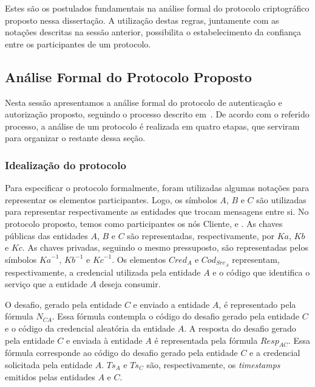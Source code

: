 Estes são os postulados fundamentais na análise formal do protocolo criptográfico proposto nessa dissertação.
A utilização destas regras, juntamente com as notações descritas na sessão anterior, possibilita o estabelecimento da confiança entre os participantes de um protocolo.

\subsection{Análise Formal do Protocolo Proposto}

Nesta sessão apresentamos a análise formal do protocolo de autenticação e autorização proposto, seguindo o processo
descrito em~\cite{Burrows1990}. De acordo com o referido processo, a análise de um protocolo é realizada em quatro etapas, que serviram para organizar o restante dessa seção.

\subsubsection{Idealização do protocolo}

\newcommand{\HT}[3]{\{\,{#1}\,\}\,{#2}\,\{\,{#3}\,\}}
\newcommand{\Msg}[3]{{#1}\longrightarrow{#2}:\,{#3}}

Para especificar o protocolo formalmente, foram utilizadas algumas notações para representar os elementos participantes. Logo, os símbolos ${A}$, ${B}$ e ${C}$ são utilizadas para representar respectivamente as entidades que trocam mensagens entre si. No protocolo proposto, temos como participantes os nós Cliente, \servidorRest{} e
\servidorAA. As chaves públicas das entidades ${A}$, ${B}$ e ${C}$ são representadas, respectivamente, por ${Ka}$, ${Kb}$ e ${Kc}$. As chaves privadas, seguindo o mesmo pressuposto, são representadas pelos símbolos ${{Ka}^{-1}}$, ${{Kb} ^{-1}}$ e ${{Kc} ^{-1}}$. Os elementos ${Cred_A}$ e ${Cod_{Srv_A}}$ representam, respectivamente,
a credencial utilizada pela entidade ${A}$ e o código que identifica o serviço que a entidade ${A}$ deseja consumir.

O desafio, gerado pela entidade ${C}$ e enviado a entidade ${A}$, \'{e} representado pela fórmula ${N_{CA}}$. Essa f\'{o}rmula contempla o código do desafio gerado pela entidade ${C}$ e o código da credencial aleatória da entidade ${A}$. A resposta do desafio gerado pela entidade ${C}$ e enviada à entidade ${A}$ é representada pela f\'{o}rmula ${Resp_{AC}}$. Essa f\'{o}rmula corresponde ao código do desafio gerado pela entidade ${C}$ e a credencial solicitada pela entidade ${A}$. ${Ts_A}$ e ${Ts_C}$ são, respectivamente, os \emph{timestamps} emitidos pelas entidades ${A}$ e ${C}$.

